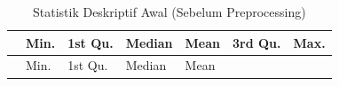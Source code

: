 \documentclass[
  11pt,
]{article}
\begin{document}
\begin{longtable}[]{@{}
  >{\raggedright\arraybackslash}p{}
  >{\raggedleft\arraybackslash}p{}
  >{\raggedleft\arraybackslash}p{}
  >{\raggedleft\arraybackslash}p{}
  >{\raggedleft\arraybackslash}p{}
  >{\raggedleft\arraybackslash}p{}
  >{\raggedleft\arraybackslash}p{}@{}}
\caption{Statistik Deskriptif Awal (Sebelum
Preprocessing)}\tabularnewline
\toprule\noalign{}
\begin{minipage}[b]{\linewidth}\raggedright
\end{minipage} & \begin{minipage}[b]{\linewidth}\raggedleft
Min.
\end{minipage} & \begin{minipage}[b]{\linewidth}\raggedleft
1st Qu.
\end{minipage} & \begin{minipage}[b]{\linewidth}\raggedleft
Median
\end{minipage} & \begin{minipage}[b]{\linewidth}\raggedleft
Mean
\end{minipage} & \begin{minipage}[b]{\linewidth}\raggedleft
3rd Qu.
\end{minipage} & \begin{minipage}[b]{\linewidth}\raggedleft
Max.
\end{minipage} \\
\midrule\noalign{}
\endfirsthead
\toprule\noalign{}
\begin{minipage}[b]{\linewidth}\raggedright
\end{minipage} & \begin{minipage}[b]{\linewidth}\raggedleft
Min.
\end{minipage} & \begin{minipage}[b]{\linewidth}\raggedleft
1st Qu.
\end{minipage} & \begin{minipage}[b]{\linewidth}\raggedleft
Median
\end{minipage} & \begin{minipage}[b]{\linewidth}\raggedleft
Mean
\end{minipage} & \begin{minipage}[b]{\linewidth}\raggedleft

\end{minipage}
\end{longtable}
\end{document}
